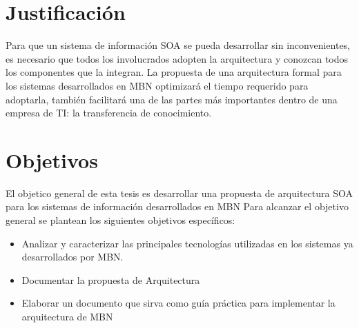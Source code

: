 \section{ Justificación }
Para que un sistema de información SOA se pueda desarrollar sin inconvenientes, es necesario que todos los involucrados adopten la arquitectura y conozcan todos los componentes que la integran.
La propuesta de una arquitectura formal para los sistemas desarrollados en MBN optimizará el tiempo requerido para adoptarla, también facilitará una de las partes más importantes dentro de una empresa de  TI: la transferencia de conocimiento. 

\section{ Objetivos }
El objetico general de esta tesis es desarrollar una propuesta de arquitectura SOA para los sistemas de información desarrollados en MBN
Para alcanzar el objetivo general se plantean los siguientes objetivos específicos:
\begin{itemize}
\item Analizar y caracterizar las principales tecnologías utilizadas en los sistemas ya desarrollados por MBN.
\item Documentar la propuesta de Arquitectura 
\item Elaborar un documento que sirva como guía práctica para implementar la arquitectura de MBN
\end{itemize}
